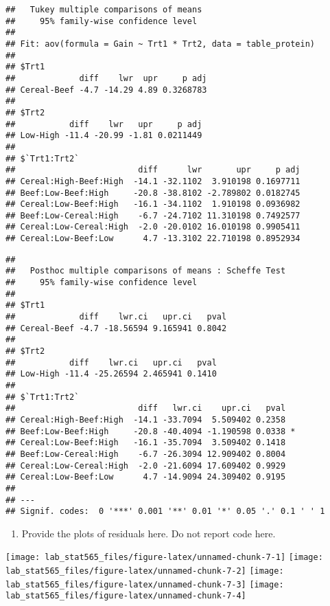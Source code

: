 \documentclass[]{article}
\providecommand{\tightlist}{%
  \setlength{\itemsep}{0pt}\setlength{\parskip}{0pt}}
\begin{document}
\begin{verbatim}
##   Tukey multiple comparisons of means
##     95% family-wise confidence level
## 
## Fit: aov(formula = Gain ~ Trt1 * Trt2, data = table_protein)
## 
## $Trt1
##             diff    lwr  upr     p adj
## Cereal-Beef -4.7 -14.29 4.89 0.3268783
## 
## $Trt2
##           diff    lwr   upr     p adj
## Low-High -11.4 -20.99 -1.81 0.0211449
## 
## $`Trt1:Trt2`
##                         diff      lwr       upr     p adj
## Cereal:High-Beef:High  -14.1 -32.1102  3.910198 0.1697711
## Beef:Low-Beef:High     -20.8 -38.8102 -2.789802 0.0182745
## Cereal:Low-Beef:High   -16.1 -34.1102  1.910198 0.0936982
## Beef:Low-Cereal:High    -6.7 -24.7102 11.310198 0.7492577
## Cereal:Low-Cereal:High  -2.0 -20.0102 16.010198 0.9905411
## Cereal:Low-Beef:Low      4.7 -13.3102 22.710198 0.8952934
\end{verbatim}

\begin{verbatim}
## 
##   Posthoc multiple comparisons of means : Scheffe Test 
##     95% family-wise confidence level
## 
## $Trt1
##             diff    lwr.ci   upr.ci   pval    
## Cereal-Beef -4.7 -18.56594 9.165941 0.8042    
## 
## $Trt2
##           diff    lwr.ci   upr.ci   pval    
## Low-High -11.4 -25.26594 2.465941 0.1410    
## 
## $`Trt1:Trt2`
##                         diff   lwr.ci    upr.ci   pval    
## Cereal:High-Beef:High  -14.1 -33.7094  5.509402 0.2358    
## Beef:Low-Beef:High     -20.8 -40.4094 -1.190598 0.0338 *  
## Cereal:Low-Beef:High   -16.1 -35.7094  3.509402 0.1418    
## Beef:Low-Cereal:High    -6.7 -26.3094 12.909402 0.8004    
## Cereal:Low-Cereal:High  -2.0 -21.6094 17.609402 0.9929    
## Cereal:Low-Beef:Low      4.7 -14.9094 24.309402 0.9195    
## 
## ---
## Signif. codes:  0 '***' 0.001 '**' 0.01 '*' 0.05 '.' 0.1 ' ' 1
\end{verbatim}

\begin{enumerate}
\def\labelenumi{(\alph{enumi})}
\setcounter{enumi}{4}
\tightlist
\item
  Provide the plots of residuals here. Do not report code here.
\end{enumerate}

\texttt{[image: lab\_stat565\_files/figure-latex/unnamed-chunk-7-1]}
\texttt{[image: lab\_stat565\_files/figure-latex/unnamed-chunk-7-2]}
\texttt{[image: lab\_stat565\_files/figure-latex/unnamed-chunk-7-3]}
\texttt{[image: lab\_stat565\_files/figure-latex/unnamed-chunk-7-4]}
\end{document}
